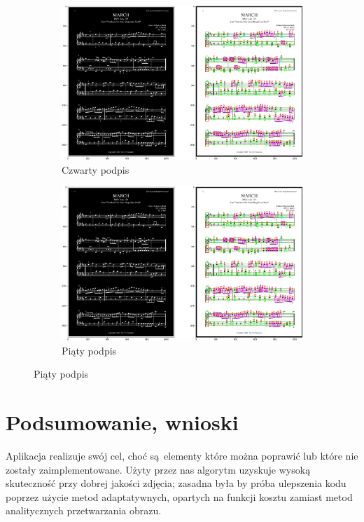\documentclass[12pt]{article}
\begin{document}
\begin{figure}[h!]
	\begin{subfigure}[b]{0.48\linewidth}
		\includegraphics[width=\linewidth]{Zdj0.png}
		\caption{Czwarty podpis}
	\end{subfigure}
	\begin{subfigure}[b]{0.48\linewidth}
		\includegraphics[width=\linewidth]{Zdj0.png}
		\caption{Piąty podpis}
	\end{subfigure}
\end{figure}

\section{Podsumowanie, wnioski}
Aplikacja realizuje swój cel, choć są elementy które można poprawić lub które nie zostały zaimplementowane. Użyty przez nas algorytm uzyskuje wysoką skuteczność przy dobrej jakości zdjęcia; zasadna była by próba ulepszenia kodu poprzez użycie metod adaptatywnych, opartych na funkcji kosztu zamiast metod analitycznych przetwarzania obrazu.
\end{document}
